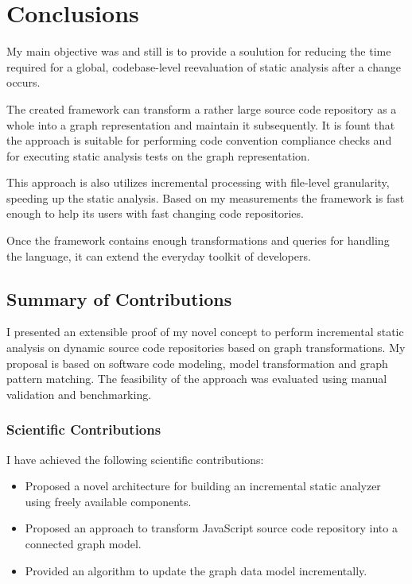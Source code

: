 \chapter{Conclusions}
\label{chap:conclusions}

My main objective was and still is to provide a soulution for reducing the time required for a global, codebase-level reevaluation of static analysis after a change occurs.

The created framework can transform a rather large source code repository as a whole into a graph representation and maintain it subsequently. It is fount that the approach is suitable for performing code convention compliance checks and for executing static analysis tests on the graph representation.

This approach is also utilizes incremental processing with file-level granularity, speeding up the static analysis. Based on my measurements the framework is fast enough to help its users with fast changing code repositories.

Once the framework contains enough transformations and queries for handling the language, it can extend the everyday toolkit of developers.

\section{Summary of Contributions}
I presented an extensible proof of my novel concept to perform incremental static analysis on dynamic source code repositories based on graph transformations. My proposal is based on software code modeling, model transformation and graph pattern matching. The feasibility of the approach was evaluated using manual validation and benchmarking.

\subsection{Scientific Contributions}
I have achieved the following scientific contributions:

\begin{itemize}[topsep=0pt]
	\item Proposed a novel architecture for building an incremental static analyzer using freely available components.
	\item Proposed an approach to transform JavaScript source code repository into a connected graph model.
	\item Provided an algorithm to update the graph data model incrementally.
\end{itemize}

